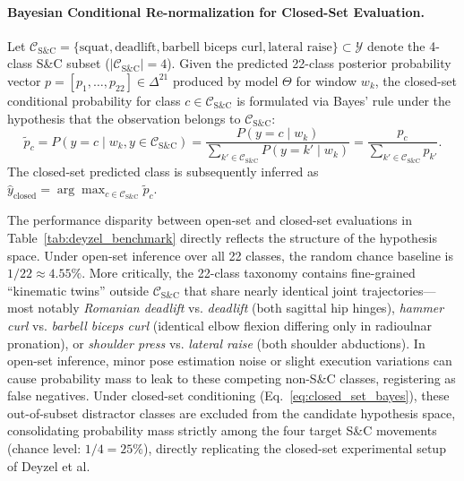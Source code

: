 \documentclass[runningheads]{llncs}
\begin{document}
\paragraph{Bayesian Conditional Re-normalization for Closed-Set Evaluation.}
Let $\mathcal{C}_{\text{S\&C}} = \{\text{squat}, \text{deadlift}, \text{barbell biceps curl}, \text{lateral raise}\} \subset \mathcal{Y}$ denote the 4-class S\&C subset ($|\mathcal{C}_{\text{S\&C}}| = 4$). Given the predicted 22-class posterior probability vector $p = [p_1, \dots, p_{22}] \in \Delta^{21}$ produced by model $\Theta$ for window $w_k$, the closed-set conditional probability for class $c \in \mathcal{C}_{\text{S\&C}}$ is formulated via Bayes' rule under the hypothesis that the observation belongs to $\mathcal{C}_{\text{S\&C}}$:
\begin{equation}
\label{eq:closed_set_bayes}
    \tilde{p}_c = P(y = c \mid w_k, y \in \mathcal{C}_{\text{S\&C}}) = \frac{P(y = c \mid w_k)}{\sum_{k' \in \mathcal{C}_{\text{S\&C}}} P(y = k' \mid w_k)} = \frac{p_c}{\sum_{k' \in \mathcal{C}_{\text{S\&C}}} p_{k'}}.
\end{equation}
The closed-set predicted class is subsequently inferred as $\hat{y}_{\text{closed}} = \arg\max_{c \in \mathcal{C}_{\text{S\&C}}} \tilde{p}_c$. 

The performance disparity between open-set and closed-set evaluations in Table~\ref{tab:deyzel_benchmark} directly reflects the structure of the hypothesis space. Under open-set inference over all 22 classes, the random chance baseline is $1/22 \approx 4.55\%$. More critically, the 22-class taxonomy contains fine-grained ``kinematic twins'' outside $\mathcal{C}_{\text{S\&C}}$ that share nearly identical joint trajectories---most notably \textit{Romanian deadlift} vs. \textit{deadlift} (both sagittal hip hinges), \textit{hammer curl} vs. \textit{barbell biceps curl} (identical elbow flexion differing only in radioulnar pronation), or \textit{shoulder press} vs. \textit{lateral raise} (both shoulder abductions). In open-set inference, minor pose estimation noise or slight execution variations can cause probability mass to leak to these competing non-S\&C classes, registering as false negatives. Under closed-set conditioning (Eq.~\eqref{eq:closed_set_bayes}), these out-of-subset distractor classes are excluded from the candidate hypothesis space, consolidating probability mass strictly among the four target S\&C movements (chance level: $1/4 = 25\%$), directly replicating the closed-set experimental setup of Deyzel et al.
\end{document}
